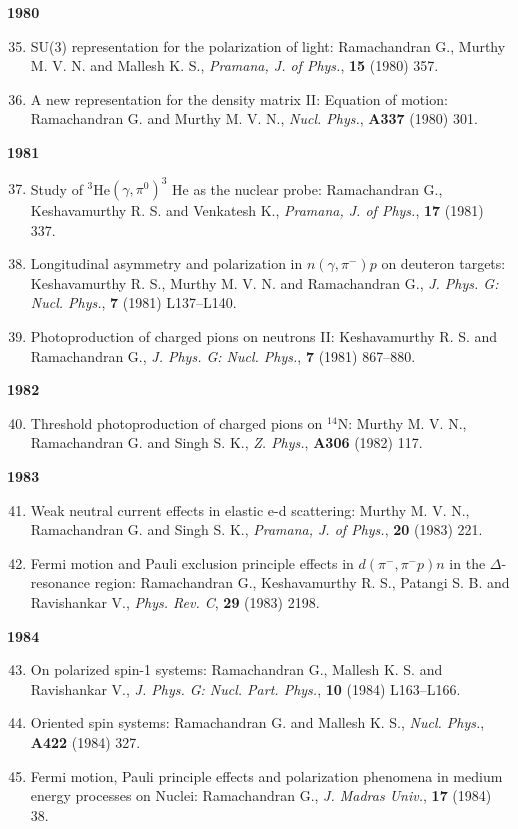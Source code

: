 \textbf{1980}
\begin{enumerate}
\setcounter{enumi}{34}
\item SU(3) representation for the polarization of light: Ramachandran G., Murthy M. V. N. and Mallesh K. S., \textit{Pramana, J. of Phys.}, {\bf 15} (1980) 357.
\item A new representation for the density matrix II: Equation of motion: Ramachandran G. and Murthy M. V. N., \textit{Nucl. Phys.}, {\bf A337} (1980) 301.
\end{enumerate}
\textbf{1981}
\begin{enumerate}
\setcounter{enumi}{36}
\item Study of $^{3}$He$(\gamma,\pi^{0})^{3}$ He as the nuclear probe: Ramachandran G., Keshavamurthy R. S. and Venkatesh K., \textit{Pramana, J. of Phys.}, {\bf 17} (1981) 337.
\item Longitudinal asymmetry and polarization in $n(\gamma,\pi^{-})p$ on deuteron targets: Keshavamurthy R. S., Murthy M. V. N. and Ramachandran G., \textit{J. Phys. G: Nucl. Phys.}, {\bf 7} (1981) L137--L140.
\item Photoproduction of charged pions on neutrons II: Keshavamurthy R. S. and Ramachandran G., \textit{J. Phys. G: Nucl. Phys.}, {\bf 7} (1981) 867--880.
\end{enumerate}
\textbf{1982}
\begin{enumerate}
\setcounter{enumi}{39}
\item Threshold photoproduction of charged pions on $^{14}$N: Murthy M. V. N., Ramachandran G. and Singh S. K., \textit{Z. Phys.}, {\bf A306} (1982) 117.
\end{enumerate}
\textbf{1983}
\begin{enumerate}
\setcounter{enumi}{40}
\item Weak neutral current effects in elastic e-d scattering: Murthy M. V. N., Ramachandran G. and Singh S. K., \textit{Pramana, J. of Phys.}, {\bf 20} (1983) 221.
\item Fermi motion and Pauli exclusion principle effects in $d(\pi^{-},\pi^{-}p)n$ in the $\Delta$-resonance region: Ramachandran G., Keshavamurthy R. S., Patangi S. B. and Ravishankar V., \textit{Phys. Rev. C}, {\bf 29} (1983) 2198.
\end{enumerate}
\textbf{1984}
\begin{enumerate}
\setcounter{enumi}{42}
\item On polarized spin-1 systems: Ramachandran G., Mallesh K. S. and Ravishankar V., \textit{J. Phys. G: Nucl. Part. Phys.}, {\bf 10} (1984) L163--L166.
\item Oriented spin systems: Ramachandran G. and Mallesh K. S., \textit{Nucl. Phys.}, {\bf A422} (1984) 327.
\item Fermi motion, Pauli principle effects and polarization phenomena in medium energy processes on Nuclei: Ramachandran G., \textit{J. Madras Univ.}, {\bf 17} (1984) 38.
\end{enumerate}
